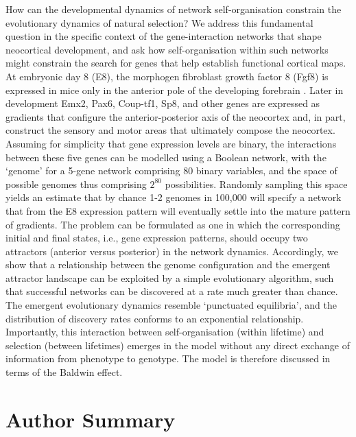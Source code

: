 \documentclass[10pt,letterpaper]{article}
\begin{document}
How can the developmental dynamics of network self-organisation constrain the evolutionary dynamics of natural selection? We address this fundamental question in the specific context of the gene-interaction networks that shape neocortical development, and ask how self-organisation within such networks might constrain the search for genes that help establish functional cortical maps. At embryonic day 8 (E8), the morphogen fibroblast growth factor 8 (Fgf8) is expressed in mice only in the anterior pole of the developing forebrain \cite{Sur2005,Rakic2009}. Later in development Emx2, Pax6, Coup-tf1, Sp8, and other genes are expressed as gradients that configure the anterior-posterior axis of the neocortex and, in part, construct the sensory and motor areas that ultimately compose the neocortex\cite{Greig2013}. Assuming for simplicity that gene expression levels are binary, the interactions between these five genes can be modelled using a Boolean network, with the `genome' for a 5-gene network comprising $80$ binary variables, and the space of possible genomes thus comprising $2^{80}$ possibilities. Randomly sampling this space yields an estimate that by chance 1-2 genomes in 100,000 will specify a network that from the E8 expression pattern will eventually settle into the mature pattern of gradients. The problem can be formulated as one in which the corresponding initial and final states, i.e., gene expression patterns, should occupy two attractors (anterior versus posterior) in the network dynamics. Accordingly, we show that a relationship between the genome configuration and the emergent attractor landscape can be exploited by a simple evolutionary algorithm, such that successful networks can be discovered at a rate much greater than chance. The emergent evolutionary dynamics resemble `punctuated equilibria', and the distribution of discovery rates conforms to an exponential relationship. Importantly, this interaction between self-organisation (within lifetime) and selection (between lifetimes) emerges in the model without any direct exchange of information from phenotype to genotype. The model is therefore discussed in terms of the Baldwin effect.

\section*{Author Summary}
\end{document}
